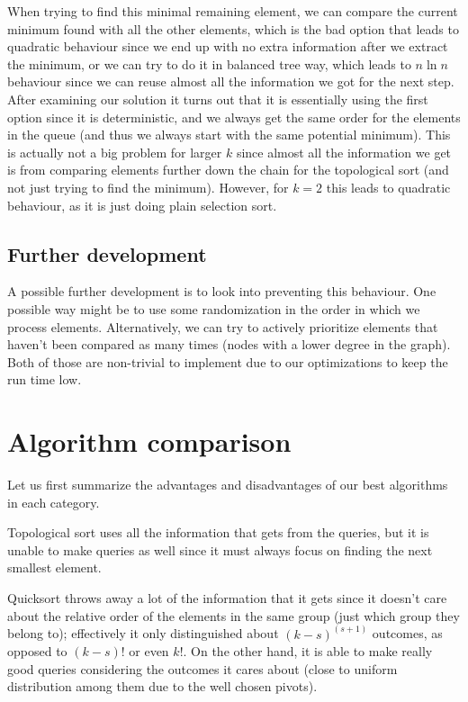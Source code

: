 \documentclass{article}
\begin{document}
When trying to find this minimal remaining element, we can compare the current minimum found with all the other elements, which is the bad option that leads to quadratic behaviour since we end up with no extra information after we extract the minimum, or we can try to do it in balanced tree way, which leads to $ n \ln n $ behaviour since we can reuse almost all the information we got for the next step. After examining our solution it turns out that it is essentially using the first option since it is deterministic, and we always get the same order for the elements in the queue (and thus we always start with the same potential minimum). This is actually not a big problem for larger $ k $ since almost all the information we get is from comparing elements further down the chain for the topological sort (and not just trying to find the minimum). However, for $ k = 2 $ this leads to quadratic behaviour, as it is just doing plain selection sort.

\subsection{Further development}

A possible further development is to look into preventing this behaviour. One possible way might be to use some randomization in the order in which we process elements. Alternatively, we can try to actively prioritize elements that haven't been compared as many times (nodes with a lower degree in the graph). Both of those are non-trivial to implement due to our optimizations to keep the run time low.

\section{Algorithm comparison}

Let us first summarize the advantages and disadvantages of our best algorithms in each category.

Topological sort uses all the information that gets from the queries, but it is unable to make queries as well since it must always focus on finding the next smallest element.

Quicksort throws away a lot of the information that it gets since it doesn't care about the relative order of the elements in the same group (just which group they belong to); effectively it only distinguished about $ (k - s)^{(s + 1)} $ outcomes, as opposed to $ (k - s)! $ or even $ k! $. On the other hand, it is able to make really good queries considering the outcomes it cares about (close to uniform distribution among them due to the well chosen pivots).
\end{document}
